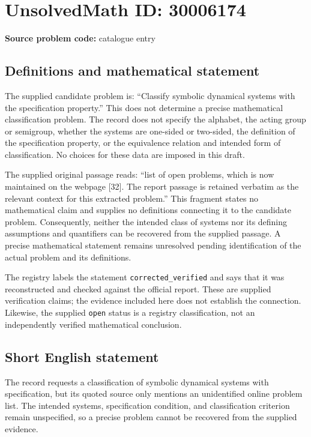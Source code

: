 \documentclass[11pt]{article}
\begin{document}
\section*{UnsolvedMath ID: 30006174}
\textbf{Source problem code:} catalogue entry
\subsection{Definitions and mathematical statement}
The supplied candidate problem is: ``Classify symbolic dynamical systems with the specification property.'' This does not determine a precise mathematical classification problem. The record does not specify the alphabet, the acting group or semigroup, whether the systems are one-sided or two-sided, the definition of the specification property, or the equivalence relation and intended form of classification. No choices for these data are imposed in this draft.

The supplied original passage reads: ``list of open problems, which is now maintained on the webpage [32]. The report passage is retained verbatim as the relevant context for this extracted problem.'' This fragment states no mathematical claim and supplies no definitions connecting it to the candidate problem. Consequently, neither the intended class of systems nor its defining assumptions and quantifiers can be recovered from the supplied passage. A precise mathematical statement remains unresolved pending identification of the actual problem and its definitions.

The registry labels the statement \texttt{corrected\_verified} and says that it was reconstructed and checked against the official report. These are supplied verification claims; the evidence included here does not establish the connection. Likewise, the supplied \texttt{open} status is a registry classification, not an independently verified mathematical conclusion.
\subsection{Short English statement}
The record requests a classification of symbolic dynamical systems with specification, but its quoted source only mentions an unidentified online problem list. The intended systems, specification condition, and classification criterion remain unspecified, so a precise problem cannot be recovered from the supplied evidence.
\end{document}

